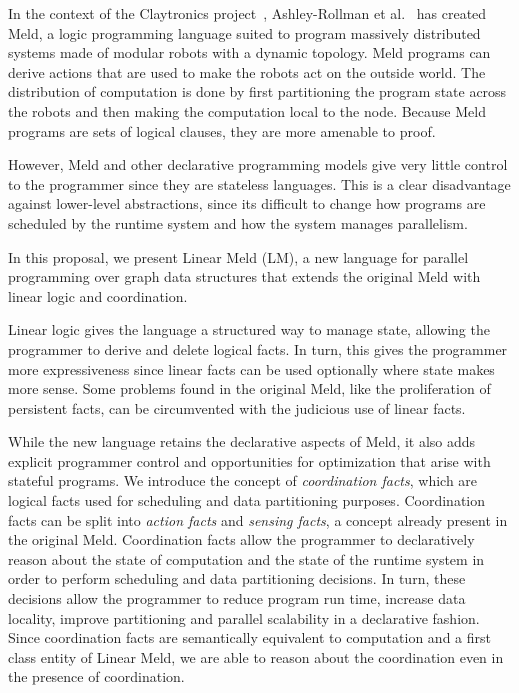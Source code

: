 In the context of the Claytronics project~\cite{goldstein-computer05},
Ashley-Rollman et al.~\cite{ashley-rollman-iclp09,
ashley-rollman-derosa-iros07wksp} has created Meld, a logic programming
language suited to program massively distributed systems made of modular
robots with a dynamic topology.  Meld programs can derive actions that are
used to make the robots act on the outside world. The distribution of
computation is done by first partitioning the program state across the
robots and then making the computation local to the node. Because Meld
programs are sets of logical clauses, they are more amenable to proof.

However, Meld and other declarative programming models give very little control
to the programmer since they are stateless languages.  This is a clear
disadvantage against lower-level abstractions, since its difficult to change how
programs are scheduled by the runtime system and how the system manages
parallelism.

In this proposal, we present Linear Meld (LM), a new language for parallel
programming over graph data structures that extends the original Meld with
linear logic and coordination.

Linear logic gives the language a structured way to manage state, allowing the
programmer to derive and delete logical facts. In turn, this gives the
programmer more expressiveness since linear facts can be used optionally where
state makes more sense. Some problems found in the original Meld, like the
proliferation of persistent facts, can be circumvented with the judicious use of
linear facts.

While the new language retains the declarative aspects of Meld, it also adds
explicit programmer control and opportunities for optimization that arise with
stateful programs.  We introduce the concept of \emph{coordination facts}, which
are logical facts used for scheduling and data partitioning purposes.
Coordination facts can be split into \emph{action facts} and \emph{sensing
facts}, a concept already present in the original Meld. Coordination facts
allow the programmer to declaratively reason about the state of computation
and the state of the runtime system in order to perform scheduling and data
partitioning decisions. In turn, these decisions allow the programmer to
reduce program run time, increase data locality, improve partitioning and
parallel scalability in a declarative fashion. Since coordination facts are
semantically equivalent to computation and a first class entity of Linear
Meld, we are able to reason about the coordination even in the presence of
coordination.

